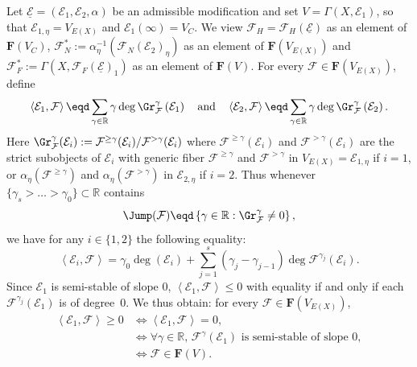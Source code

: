 Let $\underline{\mathcal{E}}=(\mathcal{E}_{1},\mathcal{E}_{2},\alpha)$ be an admissible modification and set $V=\Gamma(X,\mathcal{E}_{1})$, so that $\mathcal{E}_{1,\eta}=V_{E(X)}$ and $\mathcal{E}_{1}(\infty)=V_{C}$. We view $\mathcal{F}_{H}=\mathcal{F}_{H}(\underline{\mathcal{E}})$ as an element of $\mathbf{F}(V_{C})$, $\mathcal{F}_{N}^{\ast}:=\alpha_{\eta}^{-1}(\mathcal{F}_{N}(\mathcal{E}_{2})_{\eta})$ as an element of $\mathbf{F}(V_{E(X)})$ and $\mathcal{F}_{F}^{\ast}:=\Gamma(X,\mathcal{F}_{F}(\underline{\mathcal{E}})_{1})$ as an element of $\mathbf{F}(V)$. For every $\mathcal{F}\in\mathbf{F}(V_{E(X)})$, define
\[
\left\langle \mathcal{E}_{1},\mathcal{F}\right\rangle \eqd\sum_{\gamma\in\mathbb{R}}\gamma\deg\Gr_{\mathcal{F}}^{\gamma}\left(\mathcal{E}_{1}\right)\quad\text{and}\quad\left\langle \mathcal{E}_{2},\mathcal{F}\right\rangle \eqd\sum_{\gamma\in\mathbb{R}}\gamma\deg\Gr_{\mathcal{F}}^{\gamma}\left(\mathcal{E}_{2}\right).
\]
Here $\Gr_{\mathcal{F}}^{\gamma}(\mathcal{E}_{i}):=\mathcal{F}^{\geq\gamma}(\mathcal{E}_{i})/\mathcal{F}^{>\gamma}(\mathcal{E}_{i})$ where $\mathcal{F}^{\geq\gamma}(\mathcal{E}_{i})$ and $\mathcal{F}^{>\gamma}(\mathcal{E}_{i})$ are the strict subobjects of $\mathcal{E}_{i}$ with generic fiber $\mathcal{F}^{\geq\gamma}$ and $\mathcal{F}^{>\gamma}$ in $V_{E(X)}=\mathcal{E}_{1,\eta}$ if $i=1$, or $\alpha_{\eta}(\mathcal{F}^{\geq\gamma})$ and $\alpha_{\eta}(\mathcal{F}^{>\gamma})$ in $\mathcal{E}_{2,\eta}$ if $i=2$. Thus whenever $\{\gamma_{s}>\dots>\gamma_{0}\}\subset\mathbb{R}$ contains
\[
\Jump(\mathcal{F})\eqd\left\{ \gamma\in\mathbb{R}:\Gr_{\mathcal{F}}^{\gamma}\neq0\right\},
\]
we have for any $i\in\{1,2\}$ the following equality:
\[
\left\langle \mathcal{E}_{i},\mathcal{F}\right\rangle =\gamma_{0}\deg(\mathcal{E}_{i})+\sum_{j=1}^{s}\left(\gamma_{j}-\gamma_{j-1}\right)\deg\mathcal{F}^{\gamma_{j}}\left(\mathcal{E}_{i}\right).
\]
Since $\mathcal{E}_{1}$ is semi-stable of slope $0$, $\left\langle
\mathcal{E}_{1},\mathcal{F}\right\rangle \leq0$ with equality if and only if each $\mathcal{F}^{\gamma_{j}}(\mathcal{E}_{1})$ is of degree~$0$. We thus obtain: for every $\mathcal{F}\in\mathbf{F}(V_{E(X)})$,
\begin{align*}
\left\langle \mathcal{E}_{1},\mathcal{F}\right\rangle \geq0 & \iff \left\langle \mathcal{E}_{1},\mathcal{F}\right\rangle =0,\\
& \iff {\forall\gamma\in\mathbb{R}},\,\mathcal{F}^{\gamma}(\mathcal{E}_{1})\text{ is semi-stable of slope }0,\\
& \iff \mathcal{F}\in\mathbf{F}(V).
\end{align*}

